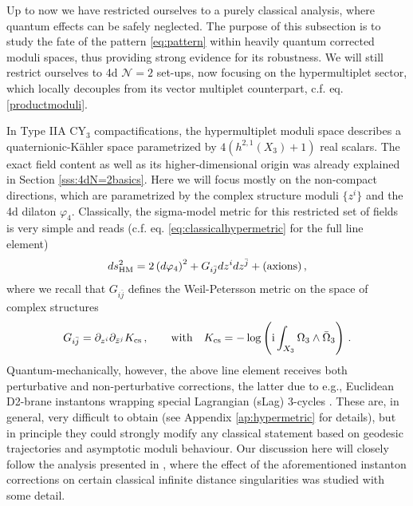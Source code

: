 	
Up to now we have restricted ourselves to a purely classical analysis, where quantum effects can be safely neglected. The purpose of this subsection is to study the fate of the pattern \eqref{eq:pattern} within heavily quantum corrected moduli spaces, thus providing strong evidence for its robustness. We will still restrict ourselves to 4d $\mathcal{N}=2$ set-ups, now focusing on the hypermultiplet sector, which locally decouples from its vector multiplet counterpart, c.f. eq. \eqref{productmoduli}. 

In Type IIA CY$_3$ compactifications, the hypermultiplet moduli space describes a quaternionic-K\"ahler space parametrized by $4(h^{2,1} (X_3)+1)$ real scalars. The exact field content as well as its higher-dimensional origin was already explained in Section \ref{sss:4dN=2basics}. Here we will focus mostly on the non-compact directions, which are parametrized by the complex structure moduli $\{ z^i\}$ and the 4d dilaton $\varphi_4$. Classically, the sigma-model metric for this restricted set of fields is very simple and reads (c.f. eq. \eqref{eq:classicalhypermetric} for the full line element)
%
\begin{align}\label{eq:classicalhypermetricnoaxions}
	ds^2_{\rm HM} = 2\left( d \varphi_4\right)^2 + G_{i \bar j} d z^i d z^{\bar j} + (\text{axions})\, ,
\end{align}
%
where we recall that $G_{i \bar j}$ defines the Weil-Petersson metric on the space of complex structures \cite{Candelas:1990pi}
%
\begin{equation}\label{eq:CSmetricpattern}
	G_{i \bar j} = \partial_{z^i}\partial_{\bar z^j} K_{\text{cs}} \, ,\qquad \text{with}\quad K_{\text{cs}}=-\log \left({\rm i} \int_{X_3}\Omega_3 \wedge \bar \Omega_3 \right)\, .
\end{equation}
%
Quantum-mechanically, however, the above line element receives both perturbative and non-perturbative corrections, the latter due to e.g., Euclidean D2-brane instantons wrapping special Lagrangian (sLag) 3-cycles \cite{Becker:1995kb}. These are, in general, very difficult to obtain (see Appendix \ref{ap:hypermetric} for details), but in principle they could strongly modify any classical statement based on geodesic trajectories and asymptotic moduli behaviour. %
Our discussion here will closely follow the analysis presented in \cite{Marchesano:2019ifh,Baume:2019sry}, where the effect of the aforementioned instanton corrections on certain classical infinite distance singularities was studied with some detail. %
	
